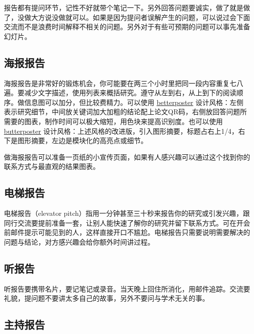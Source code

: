 \documentclass[]{tufte-book}
\begin{document}
报告都有提问环节，记性不好就带个笔记一下。另外回答问题要诚实，做了就是做了，没做大方说没做就可以。如果是因为提问者误解产生的问题，可以说过会下面交流而不是浪费时间解释不相关的问题。另外对于有些可预期的问题可以事先准备幻灯片。

\hypertarget{ux6d77ux62a5ux62a5ux544a}{%
\subsection{海报报告}\label{ux6d77ux62a5ux62a5ux544a}}

海报报告是非常好的锻炼机会，你可能要在两三个小时里把同一段内容重复七八遍。要减少文字描述，使用列表来概括研究。遵守从左到右，从上到下的阅读顺序。做信息图可以加分，但比较费精力。可以使用 \href{https://www.insidehighered.com/news/2019/06/24/theres-movement-better-scientific-posters-are-they-really-better}{betterposter} 设计风格：左侧表示研究细节，中间放关键词加大加粗的结论配上论文QR码，右侧放回答问题所需要的图表，制作时间可以极大缩短，用色块来提高识别度。也可以使用 \href{https://derekcrowe.net/butterposter}{butterposter} 设计风格：上述风格的改进版，引入图形摘要，标题占右上1/4，右下是图形摘要，左边是模块化的高亮点或细节。

做海报报告可以准备一页纸的小宣传页面，如果有人感兴趣可以通过这个找到你的联系方式与最直观的结果图表。

\hypertarget{ux7535ux68afux62a5ux544a}{%
\subsection{电梯报告}\label{ux7535ux68afux62a5ux544a}}

电梯报告（elevator pitch）指用一分钟甚至三十秒来报告你的研究或引发兴趣，跟同行交流要提前准备一套，让别人能快速了解你的研究并留下联系方式。可在开会前邮件提示可能见到的人，这样直接开口不尴尬。电梯报告只需要说明需要解决的问题与结论，对方感兴趣会给你额外时间讲过程。

\hypertarget{ux542cux62a5ux544a}{%
\subsection{听报告}\label{ux542cux62a5ux544a}}

听报告要携带名片，要记笔记或录音。当天晚上回住所消化，用邮件追踪。交流要礼貌，提问题不要讲太多自己的故事，另外不要问与学术无关的事。

\hypertarget{ux4e3bux6301ux62a5ux544a}{%
\subsection{主持报告}\label{ux4e3bux6301ux62a5ux544a}}
\end{document}
